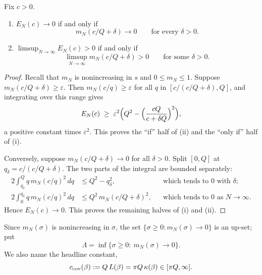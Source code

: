 \begin{lemma}\label{disp:lem:reduction}
Fix $c>0$.
\begin{enumerate}
\item[(i)] $E_N(c)\to0$ if and only if
\[
m_N(c/Q+\delta)\to0\qquad\text{for every }\delta>0 .
\]
\item[(ii)] $\limsup_{N\to\infty} E_N(c)>0$ if and only if
\[
\limsup_{N\to\infty} m_N(c/Q+\delta)>0\qquad\text{for some }\delta>0 .
\]
\end{enumerate}
\end{lemma}
\begin{proof}
Recall that $m_N$ is nonincreasing in $s$ and $0\le m_N\le1$. Suppose $m_N(c/Q+\delta)\ge\varepsilon$. Then $m_N(c/q)\ge\varepsilon$ for
all $q$ in $[c/(c/Q+\delta),Q]$, and integrating over this range gives
\begin{equation}\label{disp:eq:ENlower}
E_N(c)\;\ge\;\varepsilon^2\Bigl(Q^2-\Bigl(\frac{cQ}{c+\delta Q}\Bigr)^2\Bigr),
\end{equation}
a positive constant times $\varepsilon^2$. This proves the ``if'' half of (ii) and the ``only if'' half of (i).

Conversely, suppose $m_N(c/Q+\delta)\to0$ for all $\delta>0$. Split $[0,Q]$ at $q_\delta=c/(c/Q+\delta)$.
The two parts of the integral are bounded separately:
\begin{align*}
2\int_{q_\delta}^{Q}q\,m_N(c/q)^2\,dq&\le Q^2-q_\delta^2, &&\text{which tends to $0$ with $\delta$;}\\
2\int_{0}^{q_\delta}q\,m_N(c/q)^2\,dq&\le Q^2\,m_N(c/Q+\delta)^2, &&\text{which tends to $0$ as $N\to\infty$.}
\end{align*}
Hence $E_N(c)\to0$. This proves the remaining halves of (i) and (ii).
\end{proof}

Since $m_N(\sigma)$ is nonincreasing in $\sigma$, the set $\{\sigma\ge0: m_N(\sigma)\to0\}$ is an up-set; put
\[
\Lambda=\inf\{\sigma\ge 0:\ m_N(\sigma)\to0\}.
\]
We also name the headline constant,
\begin{equation}\label{disp:eq:ccov}
c_{\rm cov}(\beta):=Q\,L(\beta)=\pi Q\,\kappa(\beta)\in[\pi Q,\infty].
\end{equation}

